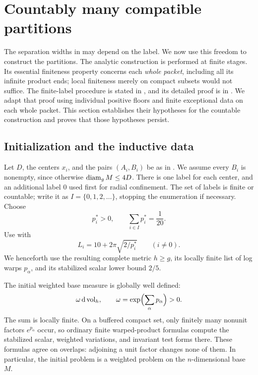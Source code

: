 \section{Countably many compatible partitions}\label{sec:countable}

The separation widths in  may depend on the label.
We now use this freedom to construct the partitions. The analytic
construction is performed at finite stages. Its essential finiteness
property concerns each \emph{whole packet}, including all its infinite
product ends; local finiteness merely on compact subsets would not
suffice. The finite-label procedure is stated in , and its detailed
proof is in .
We adapt that proof using individual positive floors and finite
exceptional data on each whole packet.
This section establishes their hypotheses for the countable construction
and proves that those hypotheses persist.

\subsection{Initialization and the inductive data}

Let $D$, the centers $x_i$, and the pairs $(A_i,B_i)$ be as in
. We assume every $B_i$ is nonempty, since otherwise
$\operatorname{diam}_g M\le4D$. There is one label for each center, and an additional
label $0$ used first for radial confinement. The set of labels is finite
or countable; write it as $I=\{0,1,2,\ldots\}$, stopping the enumeration
if necessary. Choose
\begin{equation}\label{countable:floors}
 p_i^*>0,\qquad \sum_{i\in I}p_i^*=\frac1{20}.
\end{equation}
Use  with
\begin{equation}\label{countable:widths}
 L_i=10+2\pi\sqrt{2/p_i^*}\qquad(i\ne0).
\end{equation}
We henceforth use the resulting complete metric $h\ge g$, its locally
finite list of log warps $p_\alpha$, and its stabilized scalar lower
bound $2/5$.

The initial weighted base measure is globally well defined:
\[
 \omega\,\mathrm d\operatorname{vol}_h,\qquad
 \omega=\exp\Bigl(\sum_\alpha p_\alpha\Bigr)>0.
\]
The sum is locally finite. On a buffered compact set, only finitely many
nonunit factors $e^{p_\alpha}$ occur, so ordinary finite warped-product
formulas compute the stabilized scalar, weighted variations, and
invariant test forms there. These formulas agree on overlaps: adjoining
a unit factor changes none of them. In particular, the initial problem
is a weighted problem on the $n$-dimensional base $M$.

